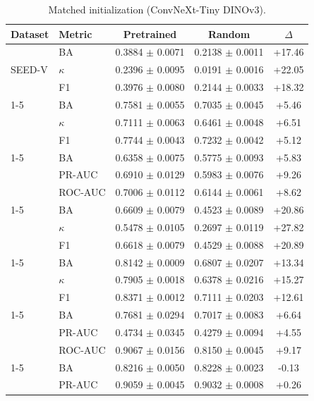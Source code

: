 \begin{table}[tbp]\centering\scriptsize\caption{Matched initialization (ConvNeXt-Tiny DINOv3).}\label{tab:app-init-convnext}\begin{tabular}{@{}l l c c c@{}}\toprule Dataset & Metric & Pretrained & Random & $\Delta$ \\ \midrule
\multirow{3}{*}{SEED-V} & BA & 0.3884 $\pm$ 0.0071 & 0.2138 $\pm$ 0.0011 & +17.46 \\
 & $\kappa$ & 0.2396 $\pm$ 0.0095 & 0.0191 $\pm$ 0.0016 & +22.05 \\
 & F1 & 0.3976 $\pm$ 0.0080 & 0.2144 $\pm$ 0.0033 & +18.32 \\
\cmidrule(lr){1-5}
\multirow{3}{*}{HMC} & BA & 0.7581 $\pm$ 0.0055 & 0.7035 $\pm$ 0.0045 & +5.46 \\
 & $\kappa$ & 0.7111 $\pm$ 0.0063 & 0.6461 $\pm$ 0.0048 & +6.51 \\
 & F1 & 0.7744 $\pm$ 0.0043 & 0.7232 $\pm$ 0.0042 & +5.12 \\
\cmidrule(lr){1-5}
\multirow{3}{*}{SHU-MI} & BA & 0.6358 $\pm$ 0.0075 & 0.5775 $\pm$ 0.0093 & +5.83 \\
 & PR-AUC & 0.6910 $\pm$ 0.0129 & 0.5983 $\pm$ 0.0076 & +9.26 \\
 & ROC-AUC & 0.7006 $\pm$ 0.0112 & 0.6144 $\pm$ 0.0061 & +8.62 \\
\cmidrule(lr){1-5}
\multirow{3}{*}{PhysioNet-MI} & BA & 0.6609 $\pm$ 0.0079 & 0.4523 $\pm$ 0.0089 & +20.86 \\
 & $\kappa$ & 0.5478 $\pm$ 0.0105 & 0.2697 $\pm$ 0.0119 & +27.82 \\
 & F1 & 0.6618 $\pm$ 0.0079 & 0.4529 $\pm$ 0.0088 & +20.89 \\
\cmidrule(lr){1-5}
\multirow{3}{*}{ISRUC} & BA & 0.8142 $\pm$ 0.0009 & 0.6807 $\pm$ 0.0207 & +13.34 \\
 & $\kappa$ & 0.7905 $\pm$ 0.0018 & 0.6378 $\pm$ 0.0216 & +15.27 \\
 & F1 & 0.8371 $\pm$ 0.0012 & 0.7111 $\pm$ 0.0203 & +12.61 \\
\cmidrule(lr){1-5}
\multirow{3}{*}{CHB-MIT} & BA & 0.7681 $\pm$ 0.0294 & 0.7017 $\pm$ 0.0083 & +6.64 \\
 & PR-AUC & 0.4734 $\pm$ 0.0345 & 0.4279 $\pm$ 0.0094 & +4.55 \\
 & ROC-AUC & 0.9067 $\pm$ 0.0156 & 0.8150 $\pm$ 0.0045 & +9.17 \\
\cmidrule(lr){1-5}
\multirow{3}{*}{TUAB} & BA & 0.8216 $\pm$ 0.0050 & 0.8228 $\pm$ 0.0023 & -0.13 \\
 & PR-AUC & 0.9059 $\pm$ 0.0045 & 0.9032 $\pm$ 0.0008 & +0.26 \\

\end{tabular}
\end{table}

